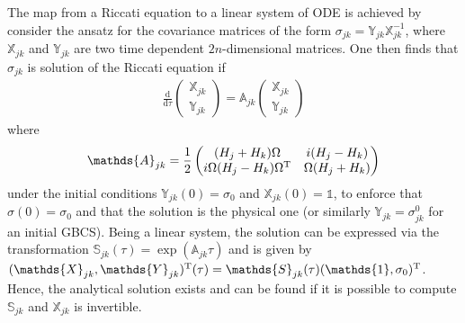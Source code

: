 \documentclass[%
reprint,
superscriptaddress,
nofootinbib,
 amsmath,amssymb,
prx,
floatfix,
]{revtex4-2}
\begin{document}
The map from a Riccati equation to a linear system of ODE is achieved by consider the ansatz for the covariance matrices of the form $\sigma_{jk} = \mathds{Y}_{jk} \mathds{X}_{jk}^{-1}$, where $\mathds{X}_{jk} $ and $ \mathds{Y}_{jk}$ are two time dependent $2n$-dimensional matrices. One then finds that $\sigma_{jk}$ is solution of the Riccati equation if 
\begin{align}
    \frac{\text{d}}{\text{d} \tau}\begin{pmatrix}
        \mathds{X}_{jk} \\
        \mathds{Y}_{jk}
    \end{pmatrix} =  \mathds{A}_{jk}
    \begin{pmatrix}
        \mathds{X}_{jk} \\
        \mathds{Y}_{jk}
    \end{pmatrix} \nonumber
\end{align}
where 
\begin{equation}
    \mathds{A}_{jk}  = \frac{1}{2} \begin{pmatrix}
           ( H_j + H_k) \Omega  &  i ( H_j - H_k) \\
          i \Omega ( H_j - H_k)  \Omega^{\rm T }   & \Omega  ( H_j + H_k   )
          \end{pmatrix}
\end{equation}
under the initial conditions $\mathds{Y}_{jk}(0) = \sigma_0$ and $\mathds{X}_{jk}(0) = \mathds{1}$, to enforce that  $\sigma (0) = \sigma_0$ and that the solution is the physical one (or similarly $\mathds{Y}_{jk} = \sigma^0_{jk}$ for an initial GBCS). Being a linear system, the solution can be expressed via the transformation $\mathds{S}_{jk} (\tau) = \exp \left( \mathds{A}_{jk}  \tau \right) $ and is given by $(\mathds{X}_{jk}, \mathds{Y}_{jk})^{\rm T} (\tau) = \mathds{S}_{jk} (\tau) ( \mathds{1}, \sigma_0)^{\rm T}$. Hence, the analytical solution exists and can be found if it is possible to compute $\mathds{S}_{jk}$ and $\mathds{X}_{jk}$ is invertible.
\end{document}
